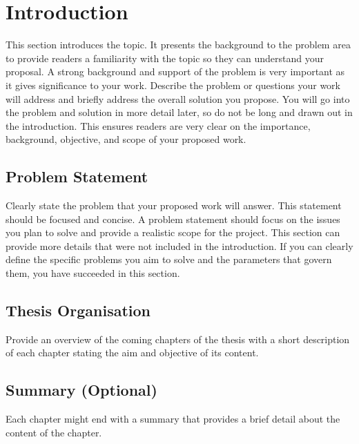 \chapter{Introduction}

\begin{justify}
This section introduces the topic.  It presents the background to the problem area to provide readers a familiarity with the topic so they can understand your proposal.  A strong background and support of the problem is very important as it gives significance to your work.  Describe the problem or questions your work will address and briefly address the overall solution you propose.  You will go into the problem and solution in more detail later, so do not be long and drawn out in the introduction.  This ensures readers are very clear on the importance, background, objective, and scope of your proposed work.
\end{justify}

\section{Problem Statement}
\begin{justify}
Clearly state the problem that your proposed work will answer.  This statement should be focused and concise.  A problem statement should focus on the issues you plan to solve and provide a realistic scope for the project.  This section can provide more details that were not included in the introduction.  If you can clearly define the specific problems you aim to solve and the parameters that govern them, you have succeeded in this section.
\end{justify}

\section{Thesis Organisation}
\begin{justify}
Provide an overview of the coming chapters of the thesis with a short description of each chapter stating the aim and objective of its content.
\end{justify}

\section{Summary (Optional)}
\begin{justify}
Each chapter might end with a summary that provides a brief detail about the content of the chapter.
\end{justify}

\clearpage
